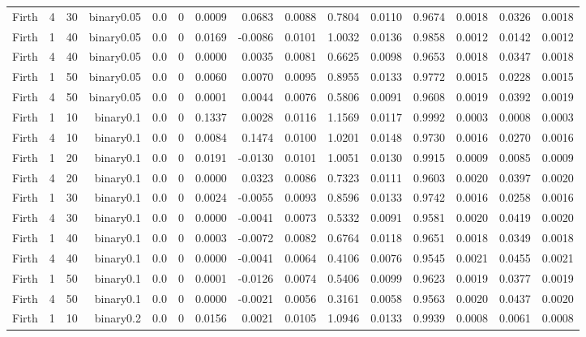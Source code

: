 \begin{longtable}{rrrrrrrrrrrrrrr}
  Firth & 4 & 30 & binary0.05 & 0.0 & 0 & 0.0009 & 0.0683 & 0.0088 & 0.7804 & 0.0110 & 0.9674 & 0.0018 & 0.0326 & 0.0018 \\ 
  Firth & 1 & 40 & binary0.05 & 0.0 & 0 & 0.0169 & -0.0086 & 0.0101 & 1.0032 & 0.0136 & 0.9858 & 0.0012 & 0.0142 & 0.0012 \\ 
  Firth & 4 & 40 & binary0.05 & 0.0 & 0 & 0.0000 & 0.0035 & 0.0081 & 0.6625 & 0.0098 & 0.9653 & 0.0018 & 0.0347 & 0.0018 \\ 
  Firth & 1 & 50 & binary0.05 & 0.0 & 0 & 0.0060 & 0.0070 & 0.0095 & 0.8955 & 0.0133 & 0.9772 & 0.0015 & 0.0228 & 0.0015 \\ 
  Firth & 4 & 50 & binary0.05 & 0.0 & 0 & 0.0001 & 0.0044 & 0.0076 & 0.5806 & 0.0091 & 0.9608 & 0.0019 & 0.0392 & 0.0019 \\ 
  Firth & 1 & 10 & binary0.1 & 0.0 & 0 & 0.1337 & 0.0028 & 0.0116 & 1.1569 & 0.0117 & 0.9992 & 0.0003 & 0.0008 & 0.0003 \\ 
  Firth & 4 & 10 & binary0.1 & 0.0 & 0 & 0.0084 & 0.1474 & 0.0100 & 1.0201 & 0.0148 & 0.9730 & 0.0016 & 0.0270 & 0.0016 \\ 
  Firth & 1 & 20 & binary0.1 & 0.0 & 0 & 0.0191 & -0.0130 & 0.0101 & 1.0051 & 0.0130 & 0.9915 & 0.0009 & 0.0085 & 0.0009 \\ 
  Firth & 4 & 20 & binary0.1 & 0.0 & 0 & 0.0000 & 0.0323 & 0.0086 & 0.7323 & 0.0111 & 0.9603 & 0.0020 & 0.0397 & 0.0020 \\ 
  Firth & 1 & 30 & binary0.1 & 0.0 & 0 & 0.0024 & -0.0055 & 0.0093 & 0.8596 & 0.0133 & 0.9742 & 0.0016 & 0.0258 & 0.0016 \\ 
  Firth & 4 & 30 & binary0.1 & 0.0 & 0 & 0.0000 & -0.0041 & 0.0073 & 0.5332 & 0.0091 & 0.9581 & 0.0020 & 0.0419 & 0.0020 \\ 
  Firth & 1 & 40 & binary0.1 & 0.0 & 0 & 0.0003 & -0.0072 & 0.0082 & 0.6764 & 0.0118 & 0.9651 & 0.0018 & 0.0349 & 0.0018 \\ 
  Firth & 4 & 40 & binary0.1 & 0.0 & 0 & 0.0000 & -0.0041 & 0.0064 & 0.4106 & 0.0076 & 0.9545 & 0.0021 & 0.0455 & 0.0021 \\ 
  Firth & 1 & 50 & binary0.1 & 0.0 & 0 & 0.0001 & -0.0126 & 0.0074 & 0.5406 & 0.0099 & 0.9623 & 0.0019 & 0.0377 & 0.0019 \\ 
  Firth & 4 & 50 & binary0.1 & 0.0 & 0 & 0.0000 & -0.0021 & 0.0056 & 0.3161 & 0.0058 & 0.9563 & 0.0020 & 0.0437 & 0.0020 \\ 
  Firth & 1 & 10 & binary0.2 & 0.0 & 0 & 0.0156 & 0.0021 & 0.0105 & 1.0946 & 0.0133 & 0.9939 & 0.0008 & 0.0061 & 0.0008 \\ 

\end{longtable}
